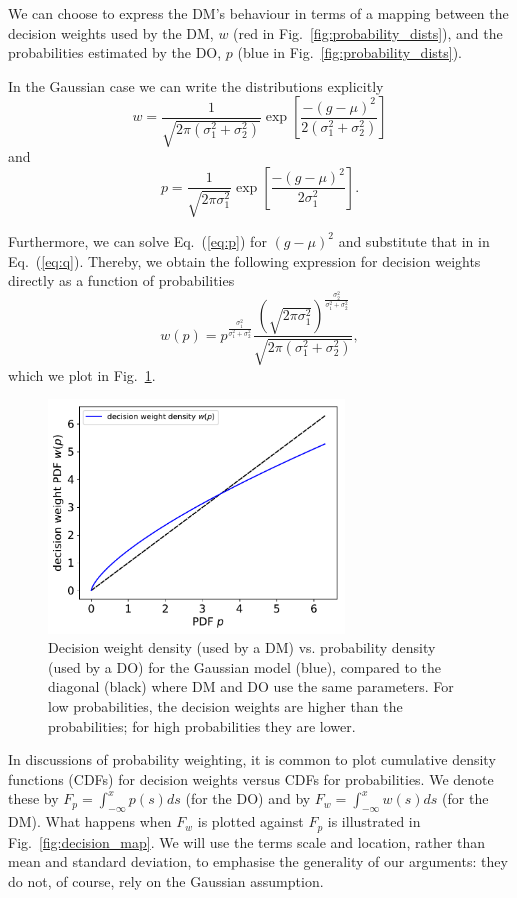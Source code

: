 \documentclass[11pt]{article}
\newcommand{\elabel}[1]{\label{eq:#1}}
\newcommand{\eref}[1]{Eq.~(\ref{eq:#1})}
\newcommand{\flabel}[1]{\label{fig:#1}}
\newcommand{\fref}[1]{Fig.~\ref{fig:#1}}
\newcommand{\be}{\begin{equation}}
\newcommand{\ee}{\end{equation}}
\numberwithin{equation}{section}
\begin{document}
We can choose to express the DM's behaviour in terms of a mapping between the decision weights used by the DM, $w$ (red in \fref{probability_dists}), and the probabilities estimated by the DO, $p$ (blue in \fref{probability_dists}).

In the Gaussian case we can write the distributions explicitly
\be
w=\frac{1}{\sqrt{2\pi (\sigma_1^2+\sigma_2^2)}}\exp\left[\frac{-(g -\mu )^2}{2 (\sigma_1^2+\sigma_2^2)}\right]
\elabel{q}
\ee
and
\be
p=\frac{1}{\sqrt{2\pi \sigma_1^2}}\exp\left[\frac{-(g -\mu )^2}{2 \sigma_1^2}\right].
\elabel{p}
\ee

Furthermore, we can solve \eref{p} for $(g -\mu )^2$ and substitute that in in \eref{q}. Thereby, we obtain the following expression for decision weights directly as a function of probabilities
\be
w(p)=p^{\frac{\sigma_1^2}{\sigma_1^2+\sigma_2^2}} \frac{\left(\sqrt{2\pi\sigma_1^2}\right)^{\frac{\sigma_2^2}{\sigma_1^2+\sigma_2^2}}}{\sqrt{2\pi(\sigma_1^2+\sigma_2^2)}},
\elabel{q_of_p}
\ee
which we plot in \fref{probability_weights}. 

\begin{figure}[!htb]
\centering
\includegraphics[width=0.7\textwidth]{./figs/decision_weights.pdf}
\caption{Decision weight density (used by a DM) vs. probability density (used by a DO) for the Gaussian model (blue), compared to the diagonal (black) where DM and DO use the same parameters. For low probabilities, the decision weights are higher than the probabilities; for high probabilities they are lower.}
\flabel{probability_weights}
\end{figure}

In discussions of probability weighting, it is common to plot cumulative density functions (CDFs) for decision weights versus CDFs for probabilities. We denote these by $F_p=\int_{-\infty}^x p(s) ds$ (for the DO) and by $F_w=\int_{-\infty}^x w(s) ds$ (for the DM). What happens when $F_w$ is plotted against $F_p$  is illustrated in \fref{decision_map}. We will use the terms scale and location, rather than mean and standard deviation, to emphasise the generality of our arguments: they do not, of course, rely on the Gaussian assumption. 
\end{document}
